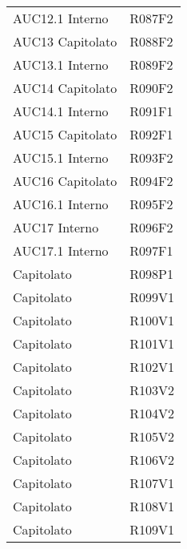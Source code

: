 \documentclass[../analisi-dei-requisiti.tex]{subfiles}
\begin{document}
\begin{longtable}[H]{ p{4cm} | p{4cm} }
  AUC12.1 Interno               & R087F2                               \\
  AUC13 Capitolato              & R088F2                               \\
  AUC13.1 Interno               & R089F2                               \\
  AUC14 Capitolato              & R090F2                               \\
  AUC14.1 Interno               & R091F1                               \\
  AUC15 Capitolato              & R092F1                               \\
  AUC15.1 Interno               & R093F2                               \\
  AUC16 Capitolato              & R094F2                               \\
  AUC16.1 Interno               & R095F2                               \\
  AUC17 Interno                 & R096F2                               \\
  AUC17.1 Interno               & R097F1                               \\
  Capitolato                    & R098P1                               \\
  Capitolato                    & R099V1                               \\
  Capitolato                    & R100V1                               \\
  Capitolato                    & R101V1                               \\
  Capitolato                    & R102V1                               \\
  Capitolato                    & R103V2                               \\
  Capitolato                    & R104V2                               \\
  Capitolato                    & R105V2                               \\
  Capitolato                    & R106V2                               \\
  Capitolato                    & R107V1                               \\
  Capitolato                    & R108V1                               \\
  Capitolato                    & R109V1                               \\

\end{longtable}
\end{document}
